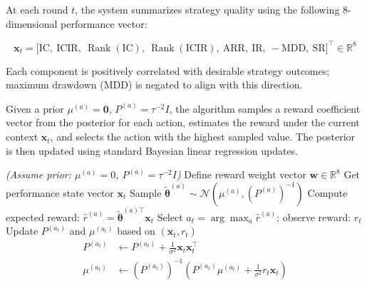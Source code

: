 \documentclass{article}
\begin{document}
At each round \( t \), the system summarizes strategy quality using the following 8-dimensional performance vector:

\[
\mathbf{x}_t = \bigl[\text{IC},\ \text{ICIR},\ \operatorname{Rank}(\text{IC}),\ \operatorname{Rank}(\text{ICIR}),\ \text{ARR},\ \text{IR},\ -\text{MDD},\ \text{SR}\bigr]^\top \in \mathbb{R}^8
\]

Each component is positively correlated with desirable strategy outcomes; maximum drawdown (MDD) is negated to align with this direction.

Given a prior \( \mu^{(a)} = \mathbf{0} \), \( P^{(a)} = \tau^{-2} I \), the algorithm samples a reward coefficient vector from the posterior for each action, estimates the reward under the current context \( \mathbf{x}_t \), and selects the action with the highest sampled value. The posterior is then updated using standard Bayesian linear regression updates.

\vspace{0.3cm}

\begin{algorithm}
\caption{Contextual Thompson Sampling scheduler used to adaptively choose between factor and model optimization.}
\label{algo:linear_thompson_two_arm}
\begin{algorithmic}[1]
\Statex \textit{(Assume prior: $\mu^{(a)} = 0$, $P^{(a)} = \tau^{-2} I$)}
\State Define reward weight vector $\mathbf{w} \in \mathbb{R}^8$
    \State Get performance state vector $\mathbf{x}_t$
        \State Sample $\tilde{\boldsymbol{\theta}}^{(a)} \sim \mathcal{N}(\mu^{(a)}, (P^{(a)})^{-1})$
        \State Compute expected reward: $\hat{r}^{(a)} = \tilde{\boldsymbol{\theta}}^{(a)\top} \mathbf{x}_t$
    \EndFor
    \State Select $a_t = \arg\max_{a} \hat{r}^{(a)}$; observe reward: $r_t$
    \State Update $P^{(a_t)}$ and $\mu^{(a_t)}$ based on $(\mathbf{x}_t, r_t)$
    \[
    \begin{aligned}
    P^{(a_t)} &\gets P^{(a_t)} + \frac{1}{\sigma^2} \mathbf{x}_t \mathbf{x}_t^\top \\
    \mu^{(a_t)} &\gets \left(P^{(a_t)}\right)^{-1} \left(P^{(a_t)} \mu^{(a_t)} + \frac{1}{\sigma^2} r_t \mathbf{x}_t\right)
    \end{aligned}
    \]
\EndFor
\end{algorithmic}
\end{algorithm}
\end{document}
